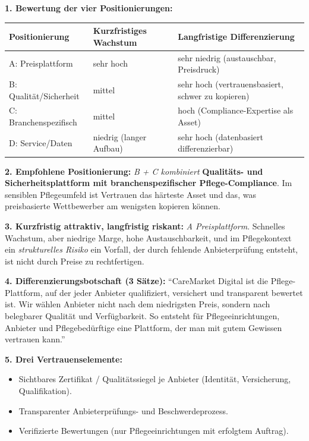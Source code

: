 \documentclass[11pt,a4paper,oneside]{article}
\begin{document}
\begin{loesungbox}
\textbf{1. Bewertung der vier Positionierungen:}

\smallskip
\begin{tabularx}{\linewidth}{@{}lXX@{}}
\toprule
\textbf{Positionierung} & \textbf{Kurzfristiges Wachstum} & \textbf{Langfristige Differenzierung} \\
\midrule
A: Preisplattform     & sehr hoch & sehr niedrig (austauschbar, Preisdruck) \\
B: Qualität/Sicherheit & mittel & sehr hoch (vertrauensbasiert, schwer zu kopieren) \\
C: Branchenspezifisch & mittel & hoch (Compliance-Expertise als Asset) \\
D: Service/Daten      & niedrig (langer Aufbau) & sehr hoch (datenbasiert differenzierbar) \\
\bottomrule
\end{tabularx}

\smallskip
\textbf{2. Empfohlene Positionierung:} \emph{B + C kombiniert} \textendash{} \textbf{Qualitäts- und Sicherheitsplattform mit branchenspezifischer Pflege-Compliance}. Im sensiblen Pflegeumfeld ist Vertrauen das härteste Asset \textendash{} und das, was preisbasierte Wettbewerber am wenigsten kopieren können.

\smallskip
\textbf{3. Kurzfristig attraktiv, langfristig riskant:} \emph{A \textendash{} Preisplattform}. Schnelles Wachstum, aber niedrige Marge, hohe Austauschbarkeit, und im Pflegekontext ein \emph{strukturelles Risiko} \textendash{} ein Vorfall, der durch fehlende Anbieterprüfung entsteht, ist nicht durch Preise zu rechtfertigen.

\smallskip
\textbf{4. Differenzierungsbotschaft (3 Sätze):}
``CareMarket Digital ist die Pflege-Plattform, auf der jeder Anbieter qualifiziert, versichert und transparent bewertet ist. Wir wählen Anbieter nicht nach dem niedrigsten Preis, sondern nach belegbarer Qualität und Verfügbarkeit. So entsteht für Pflegeeinrichtungen, Anbieter und Pflegebedürftige eine Plattform, der man mit gutem Gewissen vertrauen kann.''

\smallskip
\textbf{5. Drei Vertrauenselemente:}
\begin{itemize}
  \item Sichtbares Zertifikat / Qualitätssiegel je Anbieter (Identität, Versicherung, Qualifikation).
  \item Transparenter Anbieterprüfungs- und Beschwerdeprozess.
  \item Verifizierte Bewertungen (nur Pflegeeinrichtungen mit erfolgtem Auftrag).
\end{itemize}
\end{loesungbox}
\end{document}
